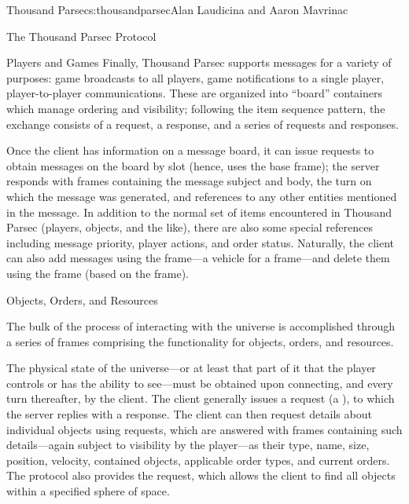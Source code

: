 \begin{aosachapter}{Thousand Parsec}{s:thousandparsec}{Alan Laudicina and Aaron Mavrinac}
\begin{aosasect1}{The Thousand Parsec Protocol}
\begin{aosasect2}{Players and Games}
Finally, Thousand Parsec supports messages for a variety of purposes:
game broadcasts to all players, game notifications to a single player,
player-to-player communications. These are organized into ``board''
containers which manage ordering and visibility; following the item
sequence pattern, the exchange consists of a 
request, a  response, and a series of
 requests and  responses.

Once the client has information on a message board, it can issue
 requests to obtain messages on the board by slot
(hence,  uses the  base
frame); the server responds with  frames containing the
message subject and body, the turn on which the message was generated,
and references to any other entities mentioned in the message. In
addition to the normal set of items encountered in Thousand Parsec
(players, objects, and the like), there are also some special
references including message priority, player actions, and order
status. Naturally, the client can also add messages using the
 frame---a vehicle for a 
frame---and delete them using the  frame (based
on the  frame).

\end{aosasect2}

\begin{aosasect2}{Objects, Orders, and Resources}

The bulk of the process of interacting with the universe is
accomplished through a series of frames comprising the functionality
for objects, orders, and resources.

The physical state of the universe---or at least that part of it that
the player controls or has the ability to see---must be obtained upon
connecting, and every turn thereafter, by the client. The client
generally issues a  request (a ), to which the server replies with a  response. The client can then request details about individual
objects using  requests, which are answered
with  frames containing such details---again subject to
visibility by the player---as their type, name, size, position,
velocity, contained objects, applicable order types, and current
orders. The protocol also provides the  request, which allows the client to find all objects
within a specified sphere of space.


\end{aosasect2}
\end{aosasect1}
\end{aosachapter}
